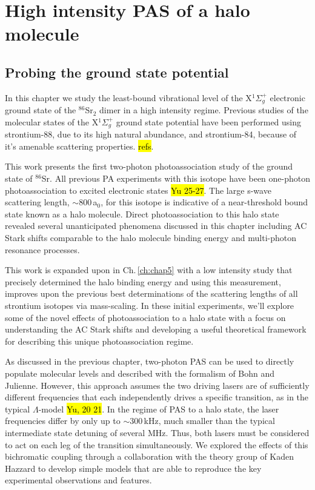 \chapter{High intensity PAS of a halo molecule} \label{ch:chap4}
\section{Probing the ground state potential} \label{sec:highE_intro}
In this chapter we study the least-bound vibrational level of the X$^1\Sigma_g^+$ electronic ground state of the $^{86}$Sr$_2$ dimer in a high intensity regime.
Previous studies of the molecular states of the X$^1\Sigma_g^+$ ground state potential have been performed using strontium-88, due to its high natural abundance, and strontium-84, because of it's amenable scattering properties. \hl{refs}.

This work presents the first two-photon photoassociation study of the ground state of $^{86}$Sr.
All previous PA experiments with this isotope have been one-photon photoassociation to excited electronic states \hl{Yu 25-27}.
The large s-wave scattering length, $\sim$800\,a$_0$, for this isotope is indicative of a near-threshold bound state known as a halo molecule.
Direct photoassociation to this halo state revealed several unanticipated phenomena discussed in this chapter including AC Stark shifts comparable to the halo molecule binding energy and multi-photon resonance processes.

This work is expanded upon in Ch.\,\ref{ch:chap5} with a low intensity study that precisely determined the halo binding energy and using this measurement, improves upon the previous best determinations of the scattering lengths of all strontium isotopes via mass-scaling.
In these initial experiments, we'll explore some of the novel effects of photoassociation to a halo state with a focus on understanding the AC Stark shifts and developing a useful theoretical framework for describing this unique photoassociation regime.

As discussed in the previous chapter, two-photon PAS can be used to directly populate molecular levels and described with the formalism of Bohn and Julienne.
However, this approach assumes the two driving lasers are of sufficiently different frequencies that each independently drives a specific transition, as in the typical $\Lambda$-model \hl{Yu, 20 21}.
In the regime of PAS to a halo state, the laser frequencies differ by only up to $\sim$300\,kHz, much smaller than the typical intermediate state detuning of several MHz.
Thus, both lasers must be considered to act on each leg of the transition simultaneously.
We explored the effects of this bichromatic coupling through a collaboration with the theory group of Kaden Hazzard to develop simple models that are able to reproduce the key experimental observations and features.

